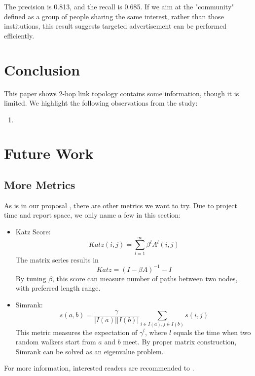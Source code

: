 \documentclass[11pt,a4paper]{article}
\begin{document}
The precision is 0.813, and the recall is 0.685. 
If we aim at the "community" defined as a group 
of people sharing the same interest, rather than 
those institutions, this result suggests targeted 
advertisement can be performed efficiently. 


\section{Conclusion}

This paper shows 2-hop link topology contains some information, 
though it is limited. We highlight the following 
observations from the study:
\begin{enumerate}
	\item 
\end{enumerate}

\section{Future Work}

\subsection{More Metrics}

As is in our proposal \cite{hu2011-cd2hop}, there are other metrics
we want to try. Due to project time and report space, we only name 
a few in this section:
\begin{itemize}
	\item Katz Score:
			\begin{equation}
				Katz(i,j)=\sum_{l=1}^{\infty}{\beta^lA^l(i,j)}
			\end{equation}
			The matrix series results in 
			\begin{equation}
				Katz = (I-\beta A)^{-1} - I
			\end{equation}
			By tuning $\beta$, this score can measure number of paths between 
			two nodes, with preferred length range. 
	\item Simrank:
			\begin{equation}
				s(a,b)=\frac{\gamma}{|I(a)||I(b)|}
				\sum_{i \in I(a), j \in I(b)} s(i,j)
			\end{equation}
			This metric measures the expectation of $\gamma^l$, where $l$ equals 
			the time when two random walkers start from $a$ and $b$ meet. By proper 
			matrix construction, Simrank can be solved as an eigenvalue problem. 
\end{itemize}
For more information, interested readers are recommended to \cite{aggarwal2011social}. 
\end{document}
